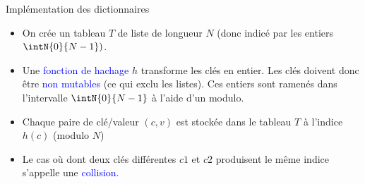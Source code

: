 \documentclass[10pt]{beamer}
\begin{document}
\begin{frame}{\Ctitle}{\stitle}
	\begin{block}{Implémentation des dictionnaires}
		\begin{itemize}
			\item<1-> On crée un tableau $T$ de liste de longueur $N$ (donc indicé par les entiers $\intN{0}{N-1})$.
			\item<2-> Une \textcolor{blue}{fonction de hachage} $h$ transforme les clés en entier. Les clés doivent donc être \textcolor{blue}{non mutables} (ce qui exclu les listes). Ces entiers sont ramenés dans l'intervalle $\intN{0}{N-1}$ à l'aide d'un modulo.
			\item<3-> Chaque paire de clé/valeur $(c,v)$ est stockée dans le tableau $T$ à l'indice $h(c)$ (modulo $N$)
			\item<4-> Le cas où dont deux clés différentes $c1$ et $c2$ produisent le même indice s'appelle une \textcolor{blue}{collision}.
		\end{itemize}
	\end{block}
\end{frame}
\end{document}
